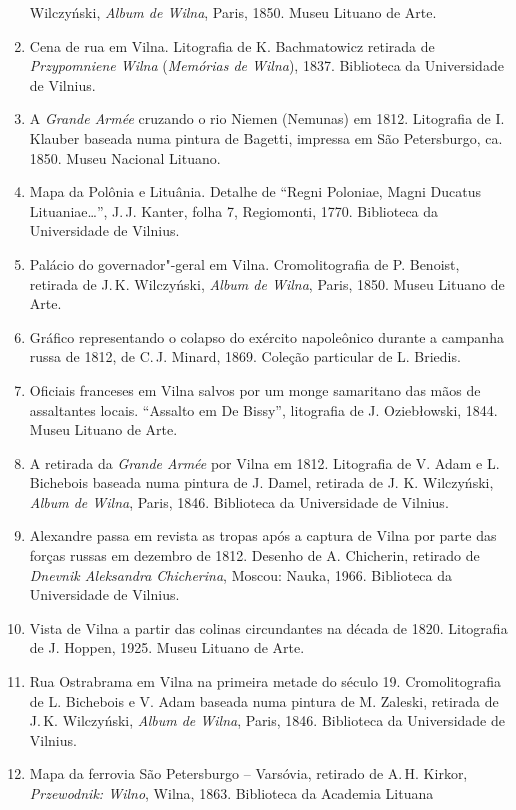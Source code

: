 \begin{enumerate}
  Wilczyński, \emph{Album de Wilna}, Paris, 1850. Museu Lituano de Arte.
\item
  Cena de rua em Vilna. Litografia de K. Bachmatowicz retirada de
  \emph{Przypomniene Wilna} (\emph{Memórias de Wilna}), 1837. Biblioteca
  da Universidade de Vilnius.
\item
  A \emph{Grande Armée} cruzando o rio Niemen (Nemunas) em 1812.
  Litografia de I. Klauber baseada numa pintura de Bagetti, impressa em
  São Petersburgo, ca. 1850. Museu Nacional Lituano.
\item
  Mapa da Polônia e Lituânia. Detalhe de ``Regni Poloniae, Magni Ducatus
  Lituaniae\ldots{}'', J.\,J. Kanter, folha 7, Regiomonti, 1770.
  Biblioteca da Universidade de Vilnius.
\item
  Palácio do governador"-geral em Vilna. Cromolitografia de P. Benoist,
  retirada de J.\,K. Wilczyński, \emph{Album de Wilna}, Paris, 1850.
  Museu Lituano de Arte.
\item
  Gráfico representando o colapso do exército napoleônico durante a
  campanha russa de 1812, de C.\,J. Minard, 1869. Coleção particular de
  L. Briedis.
\item
  Oficiais franceses em Vilna salvos por um monge samaritano das mãos de
  assaltantes locais. ``Assalto em De Bissy'', litografia de J.
  Oziebłowski, 1844. Museu Lituano de Arte.
\item
  A retirada da \emph{Grande Armée} por Vilna em 1812. Litografia de V.
  Adam e L. Bichebois baseada numa pintura de J. Damel, retirada de J.
  K. Wilczyński, \emph{Album de Wilna}, Paris, 1846. Biblioteca da
  Universidade de Vilnius.
\item
  Alexandre  passa em revista as tropas após a captura de Vilna por
  parte das forças russas em dezembro de 1812. Desenho de A. Chicherin,
  retirado de \emph{Dnevnik Aleksandra Chicherina}, Moscou: Nauka, 1966.
  Biblioteca da Universidade de Vilnius.
\item
  Vista de Vilna a partir das colinas circundantes na década de 1820.
  Litografia de J. Hoppen, 1925. Museu Lituano de Arte.
\item
  Rua Ostrabrama em Vilna na primeira metade do século 19.
  Cromolitografia de L. Bichebois e V. Adam baseada numa pintura de M.
  Zaleski, retirada de J.\,K. Wilczyński, \emph{Album de Wilna}, Paris,
  1846. Biblioteca da Universidade de Vilnius.
\item
  Mapa da ferrovia São Petersburgo -- Varsóvia, retirado de A.\,H. Kirkor,
  \emph{Przewodnik: Wilno}, Wilna, 1863. Biblioteca da Academia Lituana

\end{enumerate}
